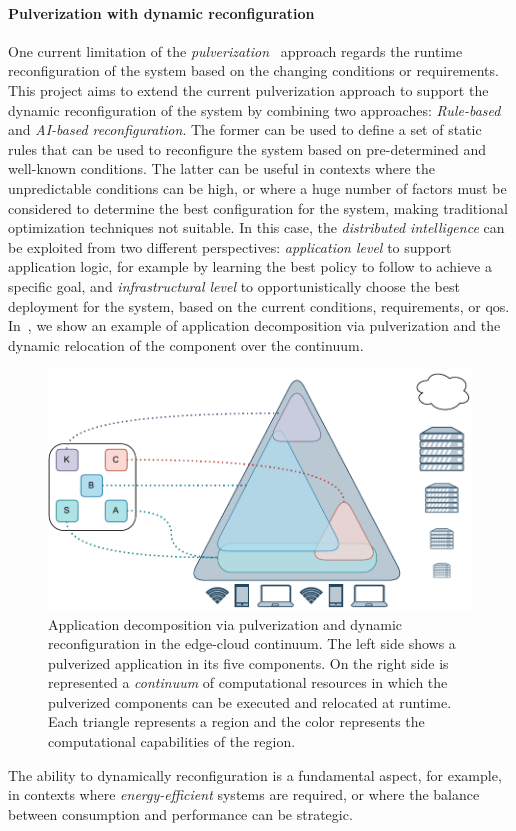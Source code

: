 \documentclass[12pt,a4paper]{article}
\begin{document}
\paragraph{Pulverization with dynamic reconfiguration}\label{sec:pulv-dyn}


One current limitation of the \emph{pulverization}~\cite{DBLP:journals/fi/CasadeiPPVW20} approach regards the runtime reconfiguration of the system based on the changing conditions or requirements.
%
This project aims to extend the current pulverization approach to support the dynamic reconfiguration of the system
by combining two approaches: \emph{Rule-based} and \emph{AI-based reconfiguration}.
%
The former can be used to define a set of static rules that can be used to reconfigure the system based on pre-determined and well-known conditions.
%
The latter can be useful in contexts where the unpredictable conditions can be high,
or where a huge number of factors must be considered to determine the best configuration for the system,
making traditional optimization techniques not suitable.
%
In this case,
the \emph{distributed intelligence} can be exploited from two different perspectives:
\emph{application level} to support application logic,
for example by learning the best policy to follow to achieve a specific goal,
and \emph{infrastructural level} to opportunistically choose the best deployment for the system,
based on the current conditions, requirements, or \ac{qos}.
%
In~,
we show an example of application decomposition via pulverization and the dynamic relocation of the component over the continuum.
%
\begin{figure}[ht]
	\centering
	\includegraphics[width=0.6\linewidth]{img/phd-proposal.drawio.pdf}
	\caption{
		Application decomposition via pulverization and dynamic reconfiguration in the edge-cloud continuum.
		The left side shows a pulverized application in its five components.
		On the right side is represented a \emph{continuum} of computational resources in which the pulverized components can be executed and relocated at runtime.
		Each triangle represents a region and the color represents the computational capabilities of the region. 
		}
	\label{fig:ai-reconf}
\end{figure}
%
The ability to dynamically reconfiguration is a fundamental aspect,
for example,
in contexts where \emph{energy-efficient} systems are required,
or where the balance between consumption and performance can be strategic.
\end{document}
